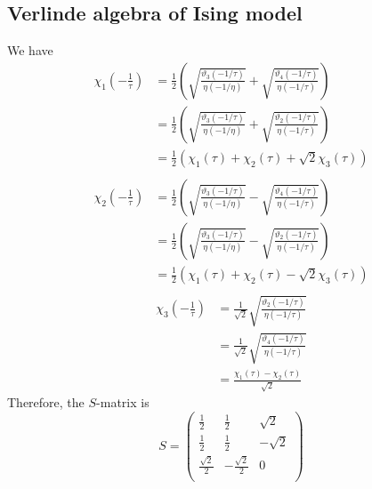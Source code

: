 \subsection{Verlinde algebra of Ising model}
We have 
\begin{equation}
	\begin{split}
	\chi_1(- \frac{1}{\tau})& = \frac{1}{2} \left(\sqrt{\frac{\vartheta_3(-1/\tau)}{\eta(-1/\eta)}} + \sqrt{\frac{\vartheta_4(-1/\tau)}{\eta(-1/\tau)}} \right)\\
	& = \frac{1}{2} \left(\sqrt{\frac{\vartheta_3(-1/\tau)}{\eta(-1/\eta)}} + \sqrt{\frac{\vartheta_2(-1/\tau)}{\eta(-1/\tau)}} \right)\\
	& = \frac{1}{2} \left( \chi_1(\tau) + \chi_2(\tau) + \sqrt{2} \chi_3(\tau) \right)\\
	\end{split}
\end{equation}
\begin{equation}
\begin{split}
\chi_2(- \frac{1}{\tau})& = \frac{1}{2} \left(\sqrt{\frac{\vartheta_3(-1/\tau)}{\eta(-1/\eta)}} - \sqrt{\frac{\vartheta_4(-1/\tau)}{\eta(-1/\tau)}} \right)\\
& = \frac{1}{2} \left(\sqrt{\frac{\vartheta_3(-1/\tau)}{\eta(-1/\eta)}} - \sqrt{\frac{\vartheta_2(-1/\tau)}{\eta(-1/\tau)}} \right)\\
& = \frac{1}{2} \left( \chi_1(\tau) + \chi_2(\tau) - \sqrt{2} \chi_3(\tau) \right)\\
\end{split}
\end{equation}
\begin{equation}
	\begin{split}
	\chi_3(- \frac{1}{\tau}) & = \frac{1}{\sqrt{2}} \sqrt{\frac{\vartheta_2(-1/\tau)}{\eta(-1/\tau)}}\\
	& = \frac{1}{\sqrt{2}}\sqrt{\frac{\vartheta_4(-1/\tau)}{\eta(-1/\tau)}}\\
	& =\frac{\chi_1(\tau)-\chi_2(\tau)}{\sqrt{2}}
	\end{split}
\end{equation}
Therefore, the $S$-matrix is 
\begin{equation}
	S= \begin{pmatrix}
	\frac{1}{2} &\frac{1}{2} & \sqrt{2} \\
	\frac{1}{2} & \frac{1}{2} & - \sqrt{2}\\
	\frac{\sqrt{2}}{2}& -\frac{\sqrt{2}}{2}& 0\\
	\end{pmatrix}
\end{equation}
